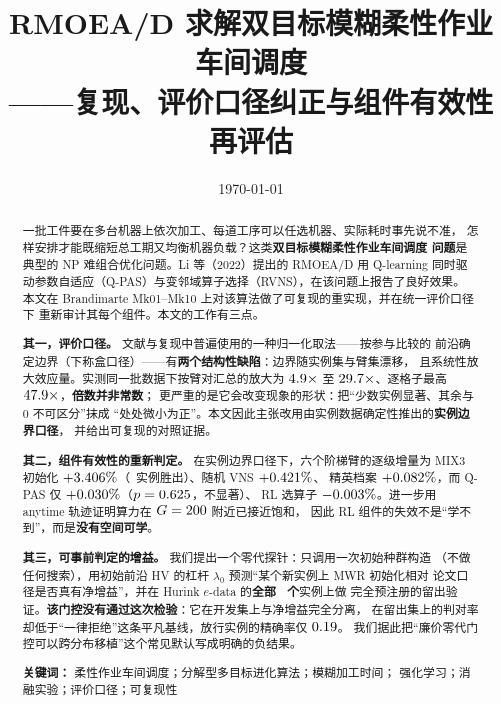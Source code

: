\documentclass[UTF8, a4paper, 11pt]{ctexart}
\title{\bfseries RMOEA/D 求解双目标模糊柔性作业车间调度\\[3pt]
\large ——复现、评价口径纠正与组件有效性再评估}
\author{}
\date{\today}
\newcommand{\lam}{\lambda_0}
\begin{document}

\maketitle
\thispagestyle{empty}

\begin{abstract}
\noindent
一批工件要在多台机器上依次加工、每道工序可以任选机器、实际耗时事先说不准，
怎样安排才能既缩短总工期又均衡机器负载？这类\textbf{双目标模糊柔性作业车间调度
问题}是典型的 NP 难组合优化问题。Li 等（2022）提出的 RMOEA/D 用 Q-learning
同时驱动参数自适应（Q-PAS）与变邻域算子选择（RVNS），在该问题上报告了良好效果。
本文在 Brandimarte Mk01--Mk10 上对该算法做了可复现的重实现，并在统一评价口径下
重新审计其每个组件。本文的工作有三点。

\textbf{其一，评价口径。} 文献与复现中普遍使用的一种归一化取法——按参与比较的
前沿确定边界（下称盒口径）——有\textbf{两个结构性缺陷}：边界随实例集与臂集漂移，
且系统性放大效应量。实测同一批数据下按臂对汇总的放大为 $4.9\times$ 至
$29.7\times$、逐格子最高 $47.9\times$，\textbf{倍数并非常数}；
更严重的是它会改变现象的形状：把“少数实例显著、其余与 0 不可区分”抹成
“处处微小为正”。本文因此主张改用由实例数据确定性推出的\textbf{实例边界口径}，
并给出可复现的对照证据。

\textbf{其二，组件有效性的重新判定。} 在实例边界口径下，六个阶梯臂的逐级增量为
MIX3 初始化 $+3.406\%$（\LadderMixWins\ 实例胜出）、随机 VNS $+0.421\%$、
精英档案 $+0.082\%$，而 Q-PAS 仅 $+0.030\%$（$p=0.625$，不显著）、
RL 选算子 $-0.003\%$。进一步用 anytime 轨迹证明算力在 $G=200$ 附近已接近饱和，
因此 RL 组件的失效不是“学不到”，而是\textbf{没有空间可学}。

\textbf{其三，可事前判定的增益。} 我们提出一个零代探针：只调用一次初始种群构造
（不做任何搜索），用初始前沿 HV 的杠杆 $\lam$ 预测“某个新实例上 MWR 初始化相对
论文口径是否真有净增益”，并在 Hurink $e$-data 的\textbf{全部 \HKn\ 个}实例上做
完全预注册的留出验证。\textbf{该门控没有通过这次检验}：它在开发集上与净增益完全分离，
在留出集上的判对率却低于“一律拒绝”这条平凡基线，放行实例的精确率仅 $0.19$。
我们据此把“廉价零代门控可以跨分布移植”这个常见默认写成明确的负结果。

\vspace{4pt}
\noindent\textbf{关键词：} 柔性作业车间调度；分解型多目标进化算法；模糊加工时间；
强化学习；消融实验；评价口径；可复现性
\end{abstract}
\end{document}

